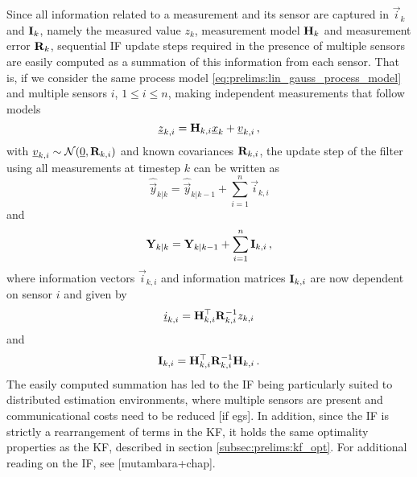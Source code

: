 Since all information related to a measurement and its sensor are captured in $\vec{i}_k$ and ${{\mathbf{I}}}_k$, namely the measured value $z_k$, measurement model ${{\mathbf{H}}}_k$ and measurement error ${{\mathbf{R}}}_k$, sequential IF update steps required in the presence of multiple sensors are easily computed as a summation of this information from each sensor. That is, if we consider the same process model \eqref{eq:prelims:lin_gauss_process_model} and multiple sensors $i$, $1\leq i\leq n$, making independent measurements that follow models
\begin{equation}
    {\underline{z}}_{k,i} = {{\mathbf{H}}}_{k,i} {\underline{x}}_k + {\underline{v}}_{k,i}\,,
\end{equation}
with ${\underline{v}}_{k,i}\sim\mathcal{N}({\underline{0}},{{\mathbf{R}}}_{k,i})$ and known covariances ${{\mathbf{R}}}_{k,i}$, the update step of the filter using all measurements at timestep $k$ can be written as
\begin{equation}\label{eq:prelims:if_info_vec_update}
    \hat{\vec{y}}_{k|k} = \hat{\vec{y}}_{k|k-1} + \sum_{i=1}^n\vec{i}_{k,i}
\end{equation}
and
\begin{equation}\label{eq:prelims:if_info_mat_update}
    {\ensuremath{{\mathbf{Y}}}}_{k|k} = {{\mathbf{Y}}}_{k|k-1} + \sum_{i=1}^n{{\mathbf{I}}}_{k,i}\,,
\end{equation}
where information vectors $\vec{i}_{k,i}$ and information matrices ${{\mathbf{I}}}_{k,i}$ are now dependent on sensor $i$ and given by
\begin{equation}\label{eq:prelims:if_measurement_vec_defn}
    {\underline{i}}_{k,i} = {{\mathbf{H}}}_{k,i}^\top{\ensuremath{{\mathbf{R}}}}_{k,i}^{-1}z_{k,i}
\end{equation}
and
\begin{equation}\label{eq:prelims:if_measurement_mat_defn}
    {\ensuremath{{\mathbf{I}}}}_{k,i} = {{\mathbf{H}}}_{k,i}^\top{\ensuremath{{\mathbf{R}}}}_{k,i}^{-1}{{\mathbf{H}}}_{k,i}\,.
\end{equation}
The easily computed summation has led to the IF being particularly suited to distributed estimation environments, where multiple sensors are present and communicational costs need to be reduced [if egs]. In addition, since the IF is strictly a rearrangement of terms in the KF, it holds the same optimality properties as the KF, described in section \ref{subsec:prelims:kf_opt}. For additional reading on the IF, see [mutambara+chap].

% 
% 

